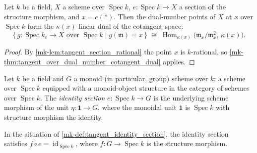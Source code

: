 \begin{corollary}\label{mk-cor:tangent_section_cotangent_dual}
  \leanok

  Let \(k\) be a field, \(X\) a scheme over \(\operatorname{Spec} k\),
  \(e : \operatorname{Spec} k \to X\) a section of the structure
  morphism, and \(x = e(*)\). Then the dual-number points of \(X\) at
  \(x\) over \(\operatorname{Spec} k\) form the \(\kappa(x)\)-linear
  dual of the cotangent space:
  \[
    \{\, g : \operatorname{Spec} k_\varepsilon \to X
        \text{ over } \operatorname{Spec} k
        \mid g(\mathfrak m) = x \,\}
    \;\cong\;
    \operatorname{Hom}_{\kappa(x)}\!\bigl(\mathfrak m_x/\mathfrak m_x^2,\,
      \kappa(x)\bigr).
  \]
\end{corollary}

\begin{proof}
  \leanok{}
  By \ref{mk-lem:tangent_section_rational} the point \(x\) is
  \(k\)-rational, so
  \ref{mk-thm:tangent_over_dual_number_cotangent_dual} applies.
\end{proof}

\begin{definition}\label{mk-def:tangent_identity_section}
  \leanok

  Let \(k\) be a field and \(G\) a monoid (in particular, group)
  scheme over \(k\): a scheme over \(\operatorname{Spec} k\) equipped
  with a monoid-object structure in the category of schemes over
  \(\operatorname{Spec} k\). The \emph{identity section}
  \(e : \operatorname{Spec} k \to G\) is the underlying scheme
  morphism of the unit \(\eta : \mathbf 1 \to G\), where the monoidal
  unit \(\mathbf 1\) is \(\operatorname{Spec} k\) with structure
  morphism the identity.
\end{definition}

\begin{lemma}\label{mk-lem:tangent_identity_section_comp}
  \leanok

  In the situation of \ref{mk-def:tangent_identity_section}, the
  identity section satisfies
  \(f \circ e = \operatorname{id}_{\operatorname{Spec} k}\), where
  \(f : G \to \operatorname{Spec} k\) is the structure morphism.
\end{lemma}


